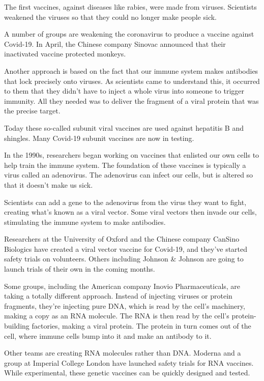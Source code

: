 The first vaccines, against diseases like rabies, were made from
viruses. Scientists weakened the viruses so that they could no longer
make people sick.

A number of groups are weakening the coronavirus to produce a vaccine
against Covid-19. In April, the Chinese company Sinovac announced that
their inactivated vaccine protected monkeys.

Another approach is based on the fact that our immune system makes
antibodies that lock precisely onto viruses. As scientists came to
understand this, it occurred to them that they didn't have to inject a
whole virus into someone to trigger immunity. All they needed was to
deliver the fragment of a viral protein that was the precise target.

Today these so-called subunit viral vaccines are used against hepatitis
B and shingles. Many Covid-19 subunit vaccines are now in testing.

In the 1990s, researchers began working on vaccines that enlisted our
own cells to help train the immune system. The foundation of these
vaccines is typically a virus called an adenovirus. The adenovirus can
infect our cells, but is altered so that it doesn't make us sick.

Scientists can add a gene to the adenovirus from the virus they want to
fight, creating what's known as a viral vector. Some viral vectors then
invade our cells, stimulating the immune system to make antibodies.

Researchers at the University of Oxford and the Chinese company CanSino
Biologics have created a viral vector vaccine for Covid-19, and they've
started safety trials on volunteers. Others including Johnson \& Johnson
are going to launch trials of their own in the coming months.

Some groups, including the American company Inovio Pharmaceuticals, are
taking a totally different approach. Instead of injecting viruses or
protein fragments, they're injecting pure DNA, which is read by the
cell's machinery, making a copy as an RNA molecule. The RNA is then read
by the cell's protein-building factories, making a viral protein. The
protein in turn comes out of the cell, where immune cells bump into it
and make an antibody to it.

Other teams are creating RNA molecules rather than DNA. Moderna and a
group at Imperial College London have launched safety trials for RNA
vaccines. While experimental, these genetic vaccines can be quickly
designed and tested.

